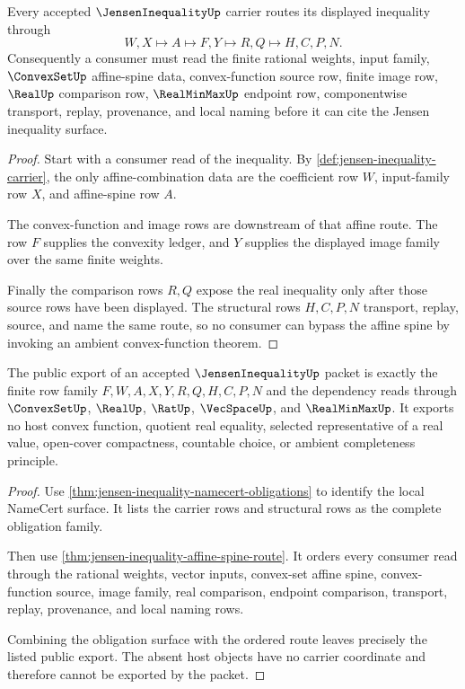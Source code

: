 \begin{theorem}
\label{thm:jensen-inequality-affine-spine-route}
Every accepted $\JensenInequalityUp$ carrier routes its displayed inequality through
$$
W,X \longmapsto A \longmapsto F,Y \longmapsto R,Q \longmapsto H,C,P,N .
$$
Consequently a consumer must read the finite rational weights, input family, $\ConvexSetUp$ affine-spine data, convex-function source row, finite image row, $\RealUp$ comparison row, $\RealMinMaxUp$ endpoint row, componentwise transport, replay, provenance, and local naming before it can cite the Jensen inequality surface.
\end{theorem}
\begin{proof}
Start with a consumer read of the inequality. By \autoref{def:jensen-inequality-carrier}, the only affine-combination data are the coefficient row $W$, input-family row $X$, and affine-spine row $A$.

The convex-function and image rows are downstream of that affine route. The row $F$ supplies the convexity ledger, and $Y$ supplies the displayed image family over the same finite weights.

Finally the comparison rows $R,Q$ expose the real inequality only after those source rows have been displayed. The structural rows $H,C,P,N$ transport, replay, source, and name the same route, so no consumer can bypass the affine spine by invoking an ambient convex-function theorem.
\end{proof}

\begin{theorem}
\label{thm:jensen-inequality-public-export}
The public export of an accepted $\JensenInequalityUp$ packet is exactly the finite row family $F,W,A,X,Y,R,Q,H,C,P,N$ and the dependency reads through $\ConvexSetUp$, $\RealUp$, $\RatUp$, $\VecSpaceUp$, and $\RealMinMaxUp$. It exports no host convex function, quotient real equality, selected representative of a real value, open-cover compactness, countable choice, or ambient completeness principle.
\end{theorem}
\begin{proof}
Use \autoref{thm:jensen-inequality-namecert-obligations} to identify the local NameCert surface. It lists the carrier rows and structural rows as the complete obligation family.

Then use \autoref{thm:jensen-inequality-affine-spine-route}. It orders every consumer read through the rational weights, vector inputs, convex-set affine spine, convex-function source, image family, real comparison, endpoint comparison, transport, replay, provenance, and local naming rows.

Combining the obligation surface with the ordered route leaves precisely the listed public export. The absent host objects have no carrier coordinate and therefore cannot be exported by the packet.
\end{proof}

